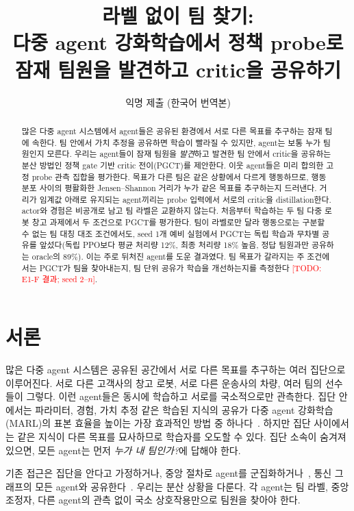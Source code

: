 \documentclass[twocolumn,10pt]{article}
\title{라벨 없이 팀 찾기:\\ 다중 agent 강화학습에서 정책 probe로 잠재 팀원을 발견하고 critic을 공유하기}
\author{익명 제출 (한국어 번역본)}
\date{}
\newcommand{\todo}[1]{\textcolor{red}{[TODO: #1]}}
\newcommand{\ours}{PGCT}
\begin{document}
\maketitle

\begin{abstract}
많은 다중 agent 시스템에서 agent들은 공유된 환경에서 서로 다른 목표를 추구하는 잠재 팀에 속한다. 팀 안에서 가치 추정을 공유하면
학습이 빨라질 수 있지만, agent는 보통 누가 팀원인지 모른다. 우리는 agent들이 잠재 팀원을 \emph{발견}하고 발견한 팀 안에서 critic을
공유하는 분산 방법인 정책 gate 기반 critic 전이(\ours{})를 제안한다. 이웃 agent들은 미리 합의한 고정 probe 관측 집합을 평가한다. 목표가
다른 팀은 같은 상황에서 다르게 행동하므로, 행동 분포 사이의 평활화한 Jensen--Shannon 거리가 누가 같은 목표를 추구하는지 드러낸다. 거리가
임계값 아래로 유지되는 agent끼리는 probe 입력에서 서로의 critic을 distillation한다. actor와 경험은 비공개로 남고 팀 라벨은 교환하지 않는다.
처음부터 학습하는 두 팀 다중 로봇 창고 과제에서 두 조건으로 \ours{}를 평가한다. 팀이 라벨로만 달라 행동으로는 구분할 수 없는 팀 대칭
대조 조건에서도, seed 1개 예비 실험에서 \ours{}는 독립 학습과 무차별 공유를 앞섰다(독립 PPO보다 평균 처리량 12\%, 최종 처리량 18\% 높음,
정답 팀원과만 공유하는 oracle의 89\%). 이는 주로 뒤처진 agent를 도운 결과였다. 팀 목표가 갈라지는 주 조건에서는 \ours{}가 팀을 찾아내는지,
팀 단위 공유가 학습을 개선하는지를 측정한다 \todo{E1-F 결과; seed 2--$n$}.
\end{abstract}

\section{서론}
많은 다중 agent 시스템은 공유된 공간에서 서로 다른 목표를 추구하는 여러 집단으로 이루어진다. 서로 다른 고객사의 창고 로봇, 서로 다른 운송사의
차량, 여러 팀의 선수들이 그렇다. 이런 agent들은 동시에 학습하고 서로를 국소적으로만 관측한다. 집단 안에서는 파라미터, 경험, 가치 추정 같은 학습된
지식의 공유가 다중 agent 강화학습(MARL)의 표본 효율을 높이는 가장 효과적인 방법 중 하나다~\cite{christianos2020seac,christianos2021seps}. 하지만
집단 사이에서는 같은 지식이 다른 목표를 묘사하므로 학습자를 오도할 수 있다. 집단 소속이 숨겨져 있으면, 모든 agent는 먼저 \emph{누가 내 팀인가?}에
답해야 한다.

기존 접근은 집단을 안다고 가정하거나, 중앙 절차로 agent를 군집화하거나~\cite{christianos2021seps,hu2025heterogeneity}, 통신 그래프의 모든 agent와
공유한다~\cite{zhang2018networked}. 우리는 분산 상황을 다룬다. 각 agent는 팀 라벨, 중앙 조정자, 다른 agent의 관측 없이 국소 상호작용만으로 팀원을
찾아야 한다.
\end{document}
